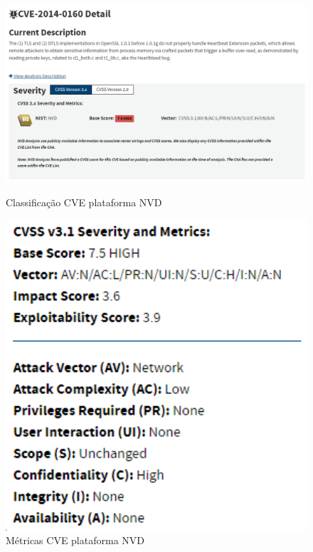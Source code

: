 \documentclass[11t]{article}
\begin{document}
\begin{figure}[H]
    \centering
    \begin{minipage}{0.62\textwidth}
        \centering
        \includegraphics[width=1\textwidth]{images/classificacaoPergunta3.png}
        \caption{Classificação CVE plataforma NVD}
    \end{minipage}
    \hfill
    \begin{minipage}{0.36\textwidth}
        \centering
        \includegraphics[width=1\textwidth]{images/metricasPergunta3.png}
        \caption{Métricas CVE plataforma NVD}
    \end{minipage}
\end{figure}
\end{document}
